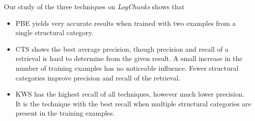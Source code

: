 
Our study of the three techniques on \emph{LogChunks} shows that
\begin{itemize}
  \item PBE yields very accurate results when trained with two examples from a
  single structural category.
  \item CTS shows the best average precision, though precision and recall of a
  retrieval is hard to determine from the given result.
  A small increase in the number of training examples has no noticeable influence. 
  Fewer structural categories improve precision and recall of the retrieval.
  \item KWS has the highest recall of all techniques, however much lower precision.
  It is the technique with the best recall when multiple structural categories
  are present in the training examples.
\end{itemize}


